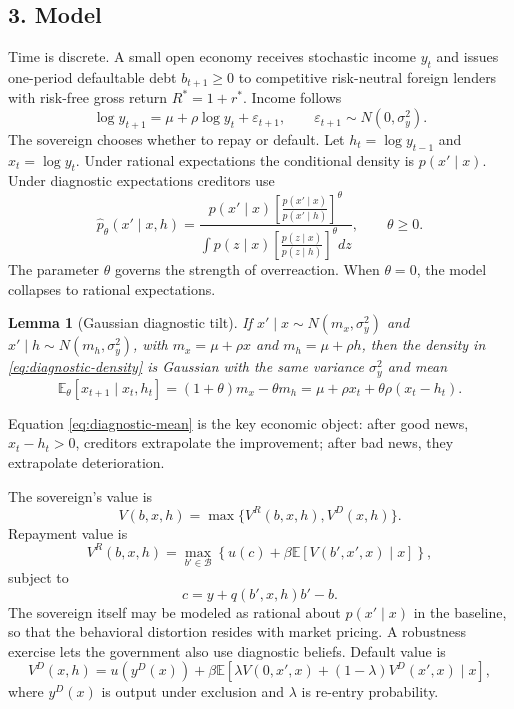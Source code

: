 \documentclass[11pt]{article}
\newtheorem{lemma}{Lemma}
\newcommand{\E}{\mathbb{E}}
\begin{document}
\subsection*{3. Model}
Time is discrete. A small open economy receives stochastic income $y_t$ and issues one-period defaultable debt $b_{t+1} \geq 0$ to competitive risk-neutral foreign lenders with risk-free gross return $R^*=1+r^*$. Income follows
\begin{equation}
\log y_{t+1}=\mu+\rho \log y_t+\varepsilon_{t+1},\qquad \varepsilon_{t+1}\sim N(0,\sigma_y^2).
\end{equation}
The sovereign chooses whether to repay or default. Let $h_t=\log y_{t-1}$ and $x_t=\log y_t$. Under rational expectations the conditional density is $p(x'\mid x)$. Under diagnostic expectations creditors use
\begin{equation}
\widehat p_{\theta}(x'\mid x,h)=\frac{p(x'\mid x)\left[\frac{p(x'\mid x)}{p(x'\mid h)}\right]^{\theta}}{\int p(z\mid x)\left[\frac{p(z\mid x)}{p(z\mid h)}\right]^{\theta}dz},\qquad \theta\geq 0. \label{eq:diagnostic-density}
\end{equation}
The parameter $\theta$ governs the strength of overreaction. When $\theta=0$, the model collapses to rational expectations.

\begin{lemma}[Gaussian diagnostic tilt]
If $x'\mid x\sim N(m_x,\sigma_y^2)$ and $x'\mid h\sim N(m_h,\sigma_y^2)$, with $m_x=\mu+\rho x$ and $m_h=\mu+\rho h$, then the density in \eqref{eq:diagnostic-density} is Gaussian with the same variance $\sigma_y^2$ and mean
\begin{equation}
\widehat{\E}_{\theta}[x_{t+1}\mid x_t,h_t]=(1+\theta)m_x-\theta m_h
=\mu+\rho x_t+\theta\rho(x_t-h_t). \label{eq:diagnostic-mean}
\end{equation}
\end{lemma}
Equation \eqref{eq:diagnostic-mean} is the key economic object: after good news, $x_t-h_t>0$, creditors extrapolate the improvement; after bad news, they extrapolate deterioration.

The sovereign's value is
\begin{equation}
V(b,x,h)=\max\{V^R(b,x,h),V^D(x,h)\}.
\end{equation}
Repayment value is
\begin{equation}
V^R(b,x,h)=\max_{b'\in \mathcal B} \left\{u(c)+\beta \E\left[V(b',x',x)\mid x\right]\right\}, \label{eq:repay}
\end{equation}
subject to
\begin{equation}
 c=y+q(b',x,h)b'-b.
\end{equation}
The sovereign itself may be modeled as rational about $p(x'\mid x)$ in the baseline, so that the behavioral distortion resides with market pricing. A robustness exercise lets the government also use diagnostic beliefs. Default value is
\begin{equation}
V^D(x,h)=u(y^{D}(x))+\beta\E\left[\lambda V(0,x',x)+(1-\lambda)V^D(x',x)\mid x\right],
\end{equation}
where $y^D(x)$ is output under exclusion and $\lambda$ is re-entry probability.
\end{document}
